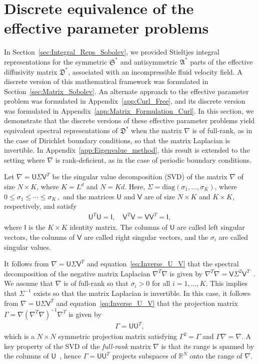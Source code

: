 \documentclass[english,12pt,jmp,graphicx]{revtex4-1}
\newcommand{\secref}[1]{Section~\ref{#1}}
\newcommand{\appref}[1]{Appendix~\ref{#1}}
\newcommand{\Sg}{\mathfrak{S}}
\newcommand{\Ag}{\mathfrak{A}}
\newcommand{\Dg}{\mathfrak{D}}
\newcommand{\Um}{\mathsf{U}}
\newcommand{\Vm}{\mathsf{V}}
\newcommand{\Ib}{\mathsf{I}}
\begin{document}
\section{Discrete equivalence of the effective parameter
  problems} \label{app:Discrete_Equivalence}
%
In \secref{sec:Integral_Reps_Sobolev}, we provided Stieltjes
integral representations for the symmetric $\Sg^*$ and antisymmetric
$\Ag^*$ parts of the effective diffusivity matrix $\Dg^*$,
associated with an incompressible fluid velocity field. A discrete
version of this mathematical framework was formulated in 
\secref{sec:Matrix_Sobolev}. An alternate approach to the effective
parameter problem was formulated in
\appref{app:Curl_Free}, and its discrete version was
formulated in \appref{app:Matrix_Formulation_Curl}.  In this section, we
demonstrate that the discrete versions of these effective parameter
problems yield equivalent spectral representations of $\Dg^*$ when the
matrix $\nabla$ is of full-rank, as in the case of Dirichlet boundary
conditions, so that the matrix Laplacian is
invertible. In \appref{app:Eigenvalue_method}, this result is extended
to the setting where $\nabla$ is rank-deficient, as in the case of
periodic boundary conditions. 



Let $\nabla=\Um\Sigma\Vm^T$ be the singular value decomposition (SVD)
of the matrix $\nabla$ of size $N\times K$, where $K=L^d$ and
$N=Kd$. Here, $\Sigma=\text{diag}(\sigma_1,\ldots,\sigma_K)$, where
$0\leq\sigma_1\leq\cdots\leq\sigma_K\,,$ and the matrices $\Um$ and
$\Vm$ are of size $N\times K$ and $K\times K$, respectively, and 
satisfy~\cite{Demmel:1997} 
%
\begin{align}\label{eq:Inverse_U_V}
  \Um^T\Um=\Ib,
  \quad
  \Vm^T\Vm=\Vm\Vm^T=\Ib,
\end{align}
%
where $\Ib$ is the $K\times K$ identity matrix. The columns of $\Um$ are called left
singular vectors, the columns of $\Vm$ are called right singular
vectors, and the $\sigma_i$ are called singular values.



It follows from $\nabla=\Um\Sigma\Vm^T$ and equation~\eqref{eq:Inverse_U_V} that
the spectral decomposition of the negative matrix Laplacian $\nabla^T\nabla$ is
given by $\nabla^T\nabla=\Vm\Sigma^2\Vm^T$~\cite{Demmel:1997}. We assume that $\nabla$ is
of full-rank so that $\sigma_i>0$ for all $i=1,\ldots,K$. This implies that
$\Sigma^{-1}$ exists so that the matrix Laplacian is invertible. In this
case, it follows from $\nabla=\Um\Sigma\Vm^T$ and
equation~\eqref{eq:Inverse_U_V} that the projection matrix
$\Gamma=\nabla(\nabla^T\nabla)^{-1}\nabla^T$ is given by  
%
\begin{align}\label{eq:Gamma_U}
  \Gamma=\Um\Um^T,
\end{align}
%
which is a $N\times N$ symmetric projection matrix satisfying
$\Gamma^2=\Gamma$ and $\Gamma\nabla=\nabla$.
A key property of the 
SVD of the \emph{full-rank} matrix $\nabla$ is
that its range is spanned by the columns of
$\Um$~\cite{Demmel:1997}, hence $\Gamma=\Um\Um^T$ projects subspaces of
$\mathbb{R}^N$ onto the range of $\nabla$. 
\end{document}
